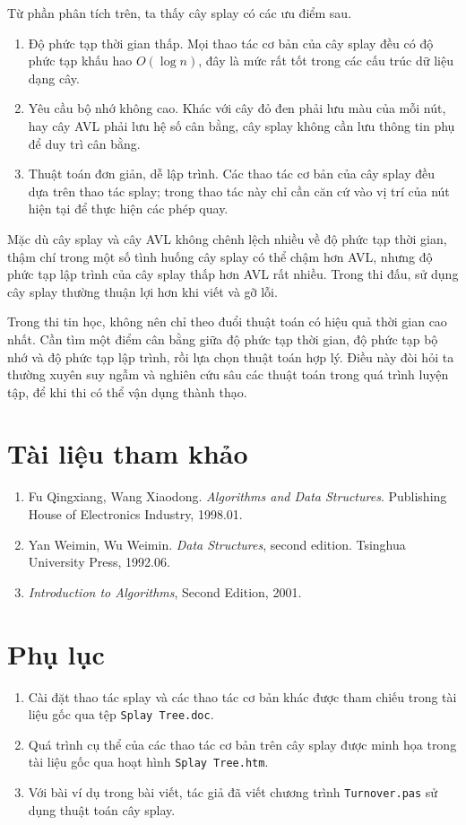 \documentclass[11pt]{article}
\begin{document}
Từ phần phân tích trên, ta thấy cây splay có các ưu điểm sau.

\begin{enumerate}
  \item Độ phức tạp thời gian thấp. Mọi thao tác cơ bản của cây splay đều có
    độ phức tạp khấu hao $O(\log n)$, đây là mức rất tốt trong các cấu trúc
    dữ liệu dạng cây.
  \item Yêu cầu bộ nhớ không cao. Khác với cây đỏ đen phải lưu màu của mỗi
    nút, hay cây AVL phải lưu hệ số cân bằng, cây splay không cần lưu thông
    tin phụ để duy trì cân bằng.
  \item Thuật toán đơn giản, dễ lập trình. Các thao tác cơ bản của cây splay
    đều dựa trên thao tác splay; trong thao tác này chỉ cần căn cứ vào vị trí
    của nút hiện tại để thực hiện các phép quay.
\end{enumerate}

Mặc dù cây splay và cây AVL không chênh lệch nhiều về độ phức tạp thời gian,
thậm chí trong một số tình huống cây splay có thể chậm hơn AVL, nhưng độ phức
tạp lập trình của cây splay thấp hơn AVL rất nhiều. Trong thi đấu, sử dụng
cây splay thường thuận lợi hơn khi viết và gỡ lỗi.

Trong thi tin học, không nên chỉ theo đuổi thuật toán có hiệu quả thời gian
cao nhất. Cần tìm một điểm cân bằng giữa độ phức tạp thời gian, độ phức tạp
bộ nhớ và độ phức tạp lập trình, rồi lựa chọn thuật toán hợp lý. Điều này đòi
hỏi ta thường xuyên suy ngẫm và nghiên cứu sâu các thuật toán trong quá trình
luyện tập, để khi thi có thể vận dụng thành thạo.

\section*{Tài liệu tham khảo}

\begin{enumerate}
  \item Fu Qingxiang, Wang Xiaodong. \textit{Algorithms and Data Structures}.
    Publishing House of Electronics Industry, 1998.01.
  \item Yan Weimin, Wu Weimin. \textit{Data Structures}, second edition.
    Tsinghua University Press, 1992.06.
  \item \textit{Introduction to Algorithms}, Second Edition, 2001.
\end{enumerate}

\section*{Phụ lục}

\begin{enumerate}
  \item Cài đặt thao tác splay và các thao tác cơ bản khác được tham chiếu
    trong tài liệu gốc qua tệp \texttt{Splay Tree.doc}.
  \item Quá trình cụ thể của các thao tác cơ bản trên cây splay được minh họa
    trong tài liệu gốc qua hoạt hình \texttt{Splay Tree.htm}.
  \item Với bài ví dụ trong bài viết, tác giả đã viết chương trình
    \texttt{Turnover.pas} sử dụng thuật toán cây splay.
\end{enumerate}
\end{document}
